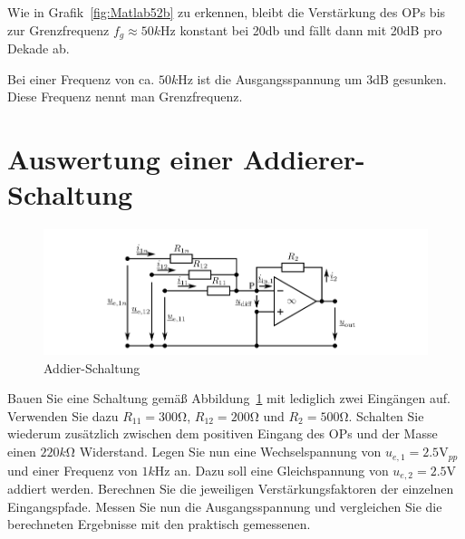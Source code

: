 \documentclass[10pt]{scrreprt}
\begin{document}
    Wie in Grafik~\ref{fig:Matlab52b} zu erkennen, bleibt die Verstärkung des OPs
    bis zur Grenzfrequenz $f_g \approx 50\si{k\hertz}$ konstant bei 20db und fällt
    dann mit 20dB pro Dekade ab.

    Bei einer Frequenz von ca. $50\si{k\hertz}$ ist die Ausgangsspannung um
    3dB gesunken. Diese Frequenz nennt man Grenzfrequenz.

    \section{Auswertung einer Addierer-Schaltung}
    \begin{center}
        \begin{figure}[H]
            \includegraphics[width=\textwidth]{abb10.png}
            \caption{Addier-Schaltung}
            \label{fig:abb10}
        \end{figure}
    \end{center}
    Bauen Sie eine Schaltung gemäß Abbildung~\ref{fig:abb10} mit lediglich zwei Eingängen auf.
    Verwenden Sie dazu $R_{11} = 300\si{\ohm}$, $R_{12} = 200\si{\ohm}$ und $R_2 = 500\si{\ohm}$. Schalten Sie wiederum zusätzlich
    zwischen dem positiven Eingang des OPs und der Masse einen $220\si{k\ohm}$ Widerstand.
    Legen Sie nun eine Wechselspannung von $u_{e,1} = 2.5\si{\volt}_{pp}$ und einer Frequenz von $1\si{k\hertz}$
    an. Dazu soll eine Gleichspannung von $u_{e,2} = 2.5\si{\volt}$ addiert werden. Berechnen Sie die
    jeweiligen Verstärkungsfaktoren der einzelnen Eingangspfade. Messen Sie nun die
    Ausgangsspannung und vergleichen Sie die berechneten Ergebnisse mit den praktisch
    gemessenen.
\end{document}
